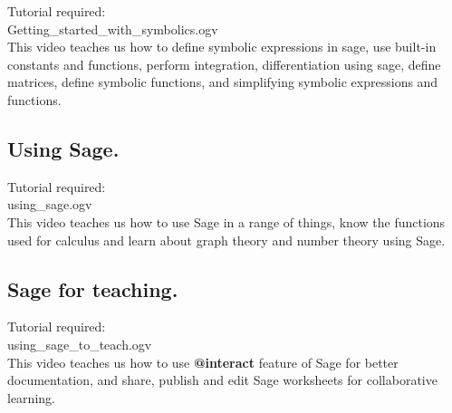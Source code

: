 \documentclass[11pt,twocolumn]{article}
\begin{document}
Tutorial required: \\ Getting\_started\_with\_symbolics.ogv \\

This video teaches us how to define symbolic expressions in sage, use built-in constants and functions, perform integration, differentiation using sage, define matrices, define symbolic functions, and simplifying symbolic expressions and functions. 
\subsection{Using Sage.}
Tutorial required:\\ using\_sage.ogv \\

This video teaches us how to use Sage in a range of things, know the functions used for calculus and learn about graph theory and number theory using Sage. 
\subsection{Sage for teaching.}
Tutorial required: \\ using\_sage\_to\_teach.ogv \\
This video teaches us how to use \textbf{@interact} feature of Sage for better documentation, and share, publish and edit Sage worksheets for collaborative learning. \\ \\
\end{document}
